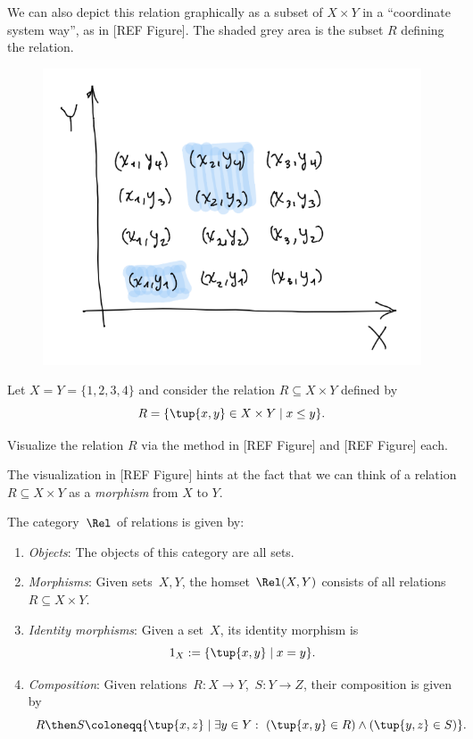 We can also depict this relation graphically as a subset of $X \times Y$ in a ``coordinate system way'', as in [REF Figure]. The shaded grey area is the subset $R$ defining the relation. 
\begin{figure}[h!]
\centering
 \includegraphics[width=0.5\linewidth]{pics/dist_net_8.png}
 \caption{}
\label{fig:example_rel_coord}
\end{figure}

\begin{exercise}
Let $X = Y = \{1, 2, 3, 4 \}$ and consider the relation $R \subseteq X \times Y$ defined by 
\begin{equation}
R = \{ \tup{x,y} \in X \times Y \mid x \leq y \}. 
\end{equation}

Visualize the relation $R$ via the method in [REF Figure] and [REF Figure] each. 
\end{exercise}

The visualization in [REF Figure] hints at the fact that we can think of a relation $R \subseteq X \times Y$ as a \emph{morphism} from $X$ to $Y$.

\begin{definition} 
    The category~$\Rel$ of relations is given by:
    \begin{enumerate}
    \item \emph{Objects}: The objects of this category are all sets.
    \item \emph{Morphisms}: Given sets~$X, Y$, the homset $\Rel(X,Y)$ consists of all
    relations~$R\subseteq X\times Y$.
    \item \emph{Identity morphisms}: Given a set~$X$, its identity morphism is
  	 \begin{equation}
	1_X := \{ \tup{x,y} \mid  x = y \}.
	\end{equation}
    \item \emph{Composition}: Given relations~$R \colon X\to Y$,~$S\colon Y\to Z$, their composition is given by
    \begin{equation}\label{RelCompRule}
    R \then S \coloneqq \{\tup{x,z} \mid  \exists y \in Y : \ \left(\tup{x,y} \in R\right) \wedge \left(\tup{y,z} \in S\right)\}.
    \end{equation}
    \end{enumerate}
\end{definition}


